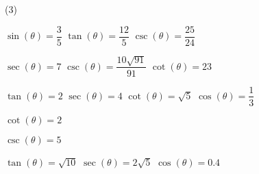 \begin{tasks}[resume](3)

\task $\sin(\theta) = \dfrac{3}{5}$  \label{findothercircfirstapprighttrig}
\task $\tan(\theta) = \dfrac{12}{5}$
\task $\csc(\theta) = \dfrac{25}{24}$

\task $\sec(\theta) = 7$  
\task $\csc(\theta) = \dfrac{10\sqrt{91}}{91}$ 
\task $\cot(\theta) = 23$ 

\task  $\tan(\theta) = 2$  
\task  $\sec(\theta) = 4$  
\task $\cot(\theta) = \sqrt{5}$ 
\task  $\cos(\theta) = \dfrac{1}{3}$ 

\task  $\cot(\theta) = 2$ 

\task  $\csc(\theta) = 5$ 

\task  $\tan(\theta) = \sqrt{10}$ 
\task  $\sec(\theta) = 2\sqrt{5}$ 
\task  $\cos(\theta) = 0.4$    \label{findothercirclastapprighttrig}

\end{tasks}

